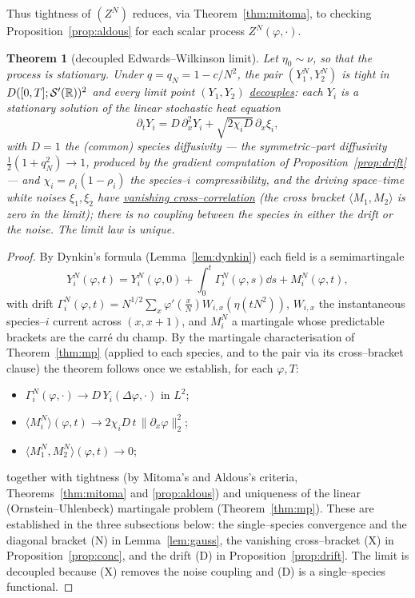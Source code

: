 \documentclass[11pt]{article}
\theoremstyle{plain}
\newtheorem{theorem}{Theorem}[section]
\theoremstyle{definition}
\theoremstyle{remark}
\begin{document}
\noindent Thus tightness of $(Z^N)$ reduces, via Theorem~\ref{thm:mitoma}, to checking
Proposition~\ref{prop:aldous} for each scalar process $Z^N(\varphi,\cdot)$.

\begin{theorem}[decoupled Edwards--Wilkinson limit]\label{thm:ewmain}
Let $\eta_0\sim\nu$, so that the process is stationary. Under $q=q_N=1-c/N^2$, the
pair $(Y_1^N,Y_2^N)$ is tight in
$D([0,T];\mathcal S'(\mathbb{R}))^2$ and every limit point $(Y_1,Y_2)$ \underline{decouples}: each $Y_i$ is
a stationary solution of the linear stochastic heat equation
\[
  \partial_t Y_i=D\,\partial_x^2 Y_i+\sqrt{2\chi_i D}\,\partial_x\xi_i,
\]
with $D=1$ the (common) species diffusivity --- the symmetric--part diffusivity
$\tfrac12(1+q_N^2)\to1$, produced by the gradient computation of
Proposition~\ref{prop:drift} --- and $\chi_i=\rho_i(1-\rho_i)$ the
species--$i$ compressibility,
and the driving space--time white noises $\xi_1,\xi_2$ have \underline{vanishing
cross--correlation} (the cross bracket $\langle M_1,M_2\rangle$ is zero in the limit);
there is no coupling between the species in either the drift or the noise. The limit
law is unique.
\end{theorem}

\begin{proof}
By Dynkin's formula (Lemma~\ref{lem:dynkin}) each field is a semimartingale
\begin{equation}\label{eq:dynkin}
  Y_i^N(\varphi,t)=Y_i^N(\varphi,0)+\int_0^t\Gamma_i^N(\varphi,s)\dd s+M_i^N(\varphi,t),
\end{equation}
with drift $\Gamma_i^N(\varphi,t)=N^{1/2}\sum_x\varphi'(\tfrac xN)W_{i,x}(\eta(tN^2))$,
$W_{i,x}$ the instantaneous species--$i$ current across $(x,x{+}1)$, and $M_i^N$ a
martingale whose predictable brackets are the carr\'e du champ. By the martingale
characterisation of Theorem~\ref{thm:mp} (applied to each species, and to the pair via
its cross--bracket clause) the theorem follows once we establish, for each $\varphi,T$:
\begin{itemize}
\item[\textup{(D)}] $\Gamma_i^N(\varphi,\cdot)\to D\,Y_i(\Delta\varphi,\cdot)$ in $L^2$;
\item[\textup{(N)}] $\langle M_i^N\rangle(\varphi,t)\to 2\chi_i D\,t\,\|\partial_x\varphi\|_2^2$;
\item[\textup{(X)}] $\langle M_1^N,M_2^N\rangle(\varphi,t)\to0$;
\end{itemize}
together with tightness (by Mitoma's and Aldous's criteria,
Theorems~\ref{thm:mitoma} and \ref{prop:aldous}) and uniqueness of the linear
(Ornstein--Uhlenbeck) martingale problem (Theorem~\ref{thm:mp}). These
are established in the three subsections below: the single--species convergence and the
diagonal bracket (N) in Lemma~\ref{lem:gauss}, the vanishing cross--bracket (X) in
Proposition~\ref{prop:conc}, and the drift (D) in Proposition~\ref{prop:drift}. The
limit is decoupled because (X) removes the noise coupling and (D) is a single--species
functional.
\end{proof}
\end{document}
